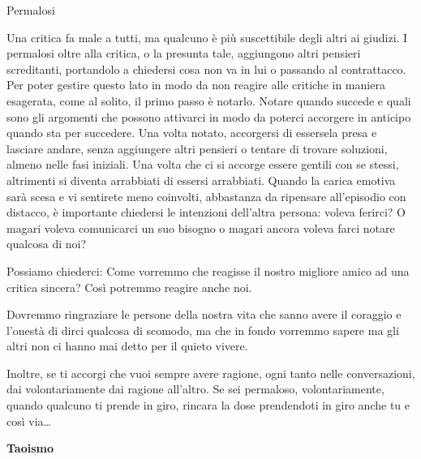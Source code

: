 \documentclass[12pt]{book} %
\begin{document}
\bigskip
\begin{mdframed}[linewidth=1pt]
Permalosi

Una critica fa male a tutti, ma qualcuno è più suscettibile degli altri ai giudizi. I permalosi oltre alla critica, o la
presunta tale, aggiungono altri pensieri screditanti, portandolo a chiedersi cosa non va in lui o passando al
contrattacco. Per poter gestire questo lato in modo da non reagire alle critiche in maniera esagerata, come al solito,
il primo passo è notarlo. Notare quando succede e quali sono gli argomenti che possono attivarci in modo da poterci
accorgere in anticipo quando sta per succedere. Una volta notato, accorgersi di essersela presa e lasciare andare,
senza aggiungere altri pensieri o tentare di trovare soluzioni, almeno nelle fasi iniziali. Una volta che ci si accorge
essere gentili con se stessi, altrimenti si diventa arrabbiati di essersi arrabbiati. Quando la carica emotiva sarà
scesa e vi sentirete meno coinvolti, abbastanza da ripensare all'episodio con distacco, è
importante chiedersi le intenzioni dell'altra persona: voleva ferirci? O magari voleva comunicarci
un suo bisogno o magari ancora voleva farci notare qualcosa di noi?

Possiamo chiederci: Come vorremmo che reagisse il nostro migliore amico ad una critica sincera? Così potremmo reagire
anche noi. 

Dovremmo ringraziare le persone della nostra vita che sanno avere il coraggio e l'onestà di dirci
qualcosa di scomodo, ma che in fondo vorremmo sapere ma gli altri non ci hanno mai detto per il quieto vivere.

Inoltre, se ti accorgi che vuoi sempre avere ragione, ogni tanto nelle conversazioni, dai volontariamente dai ragione
all'altro. Se sei permaloso, volontariamente, quando qualcuno ti prende in giro, rincara la dose prendendoti in giro
anche tu e così via…
\end{mdframed}

\textbf{Taoismo}
\end{document}
